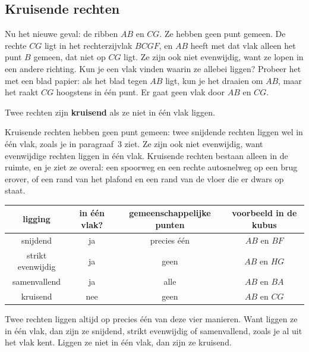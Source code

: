 \subsection{Kruisende rechten}

Nu het nieuwe geval: de ribben $AB$ en $CG$. Ze hebben geen punt gemeen. De rechte $CG$ ligt in het rechterzijvlak $BCGF$, en $AB$ heeft met dat vlak alleen het punt $B$ gemeen, dat niet op $CG$ ligt. Ze zijn ook niet evenwijdig, want ze lopen in een andere richting. Kun je een vlak vinden waarin ze allebei liggen? Probeer het met een blad papier: als het blad tegen $AB$ ligt, kun je het draaien om $AB$, maar het raakt $CG$ hoogstens in één punt. Er gaat geen vlak door $AB$ en $CG$.

\begin{theorie}
Twee rechten zijn \textbf{\textcolor{accent}{kruisend}} als ze niet in één vlak liggen.
\end{theorie}

Kruisende rechten hebben geen punt gemeen: twee snijdende rechten liggen wel in één vlak, zoals je in paragraaf~3 ziet. Ze zijn ook niet evenwijdig, want evenwijdige rechten liggen in één vlak. Kruisende rechten bestaan alleen in de ruimte, en je ziet ze overal: een spoorweg en een rechte autosnelweg op een brug erover, of een rand van het plafond en een rand van de vloer die er dwars op staat.

\begin{center}
\renewcommand{\arraystretch}{1.35}
\begin{tabular}{|c|c|c|c|}
\hline
\textbf{ligging} & \textbf{in één vlak?} & \textbf{gemeenschappelijke punten} & \textbf{voorbeeld in de kubus} \\ \hline
snijdend & ja & precies één & $AB$ en $BF$ \\ \hline
strikt evenwijdig & ja & geen & $AB$ en $HG$ \\ \hline
samenvallend & ja & alle & $AB$ en $BA$ \\ \hline
kruisend & nee & geen & $AB$ en $CG$ \\ \hline
\end{tabular}
\end{center}

Twee rechten liggen altijd op precies één van deze vier manieren. Want liggen ze in één vlak, dan zijn ze snijdend, strikt evenwijdig of samenvallend, zoals je al uit het vlak kent. Liggen ze niet in één vlak, dan zijn ze kruisend.

\begin{oefeningen}
\end{oefeningen}


